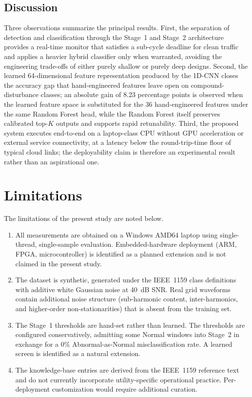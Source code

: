 \documentclass[conference]{IEEEtran}
\begin{document}
\subsection{Discussion}
Three observations summarize the principal results. First, the
separation of detection and classification through the Stage~1 and
Stage~2 architecture provides a real-time monitor that satisfies a
sub-cycle deadline for clean traffic and applies a heavier hybrid
classifier only when warranted, avoiding the engineering trade-offs
of either purely shallow or purely deep designs. Second, the learned
64-dimensional feature representation produced by the 1D-CNN closes
the accuracy gap that hand-engineered features leave open on
compound-disturbance classes; an absolute gain of 8.23 percentage
points is observed when the learned feature space is substituted for
the 36 hand-engineered features under the same Random Forest head,
while the Random Forest itself preserves calibrated top-$K$ outputs
and supports rapid retunability. Third, the proposed system executes
end-to-end on a laptop-class CPU without GPU acceleration or external
service connectivity, at a latency below the round-trip-time floor of
typical cloud links; the deployability claim is therefore an
experimental result rather than an aspirational one.

\section{Limitations}\label{sec:limits}
The limitations of the present study are noted below.

\begin{enumerate}
  \item All measurements are obtained on a Windows AMD64 laptop using
        single-thread, single-sample evaluation. Embedded-hardware
        deployment (ARM, FPGA, microcontroller) is identified as a
        planned extension and is not claimed in the present study.
  \item The dataset is synthetic, generated under the IEEE~1159 class
        definitions with additive white Gaussian noise at 40~dB SNR.
        Real grid waveforms contain additional noise structure
        (sub-harmonic content, inter-harmonics, and higher-order
        non-stationarities) that is absent from the training set.
  \item The Stage~1 thresholds are hand-set rather than learned. The
        thresholds are configured conservatively, admitting some
        Normal windows into Stage~2 in exchange for a 0\%
        Abnormal-as-Normal misclassification rate. A learned screen
        is identified as a natural extension.
  \item The knowledge-base entries are derived from the IEEE~1159
        reference text and do not currently incorporate
        utility-specific operational practice. Per-deployment
        customization would require additional curation.
\end{enumerate}
\end{document}
